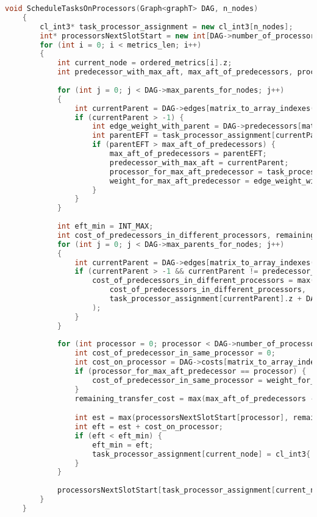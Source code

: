 \newpage
\begin{lstlisting}[language=C++, caption={Algoritmo di selezione del processore},captionpos=b]
	void ScheduleTasksOnProcessors(Graph<graphT> DAG, n_nodes)
	{
		cl_int3* task_processor_assignment = new cl_int3[n_nodes];
		int* processorsNextSlotStart = new int[DAG->number_of_processors];
		for (int i = 0; i < metrics_len; i++)
		{
			int current_node = ordered_metrics[i].z; 
			int predecessor_with_max_aft, max_aft_of_predecessors, processor_for_max_aft_predecessor, weight_for_max_aft_predecessor;
			
			for (int j = 0; j < DAG->max_parents_for_nodes; j++)
			{
				int currentParent = DAG->edges[matrix_to_array_indexes(j, current_node, DAG->len)];
				if (currentParent > -1) {
					int edge_weight_with_parent = DAG->predecessors[matrix_to_array_indexes(j, current_node, DAG->len)];
					int parentEFT = task_processor_assignment[currentParent].z + edge_weight_with_parent;
					if (parentEFT > max_aft_of_predecessors) {
						max_aft_of_predecessors = parentEFT;
						predecessor_with_max_aft = currentParent;
						processor_for_max_aft_predecessor = task_processor_assignment[currentParent].x;
						weight_for_max_aft_predecessor = edge_weight_with_parent;
					}
				}
			}
			
			int eft_min = INT_MAX;
			int cost_of_predecessors_in_different_processors, remaining_transfer_cost;
			for (int j = 0; j < DAG->max_parents_for_nodes; j++)
			{
				int currentParent = DAG->edges[matrix_to_array_indexes(j, current_node, DAG->len)];
				if (currentParent > -1 && currentParent != predecessor_with_max_aft) {
					cost_of_predecessors_in_different_processors = max(
						cost_of_predecessors_in_different_processors,
						task_processor_assignment[currentParent].z + DAG->predecessors[matrix_to_array_indexes(j, current_node, DAG->len)]
					);
				}
			}
			
			for (int processor = 0; processor < DAG->number_of_processors; processor++) {
				int cost_of_predecessor_in_same_processor = 0;
				int cost_on_processor = DAG->costs[matrix_to_array_indexes(current_node, processor, DAG->number_of_processors)];
				if (processor_for_max_aft_predecessor == processor) {
					cost_of_predecessor_in_same_processor = weight_for_max_aft_predecessor;
				}
				remaining_transfer_cost = max(max_aft_of_predecessors - cost_of_predecessor_in_same_processor, cost_of_predecessors_in_different_processors);

				int est = max(processorsNextSlotStart[processor], remaining_transfer_cost);
				int eft = est + cost_on_processor;
				if (eft < eft_min) {
					eft_min = eft;
					task_processor_assignment[current_node] = cl_int3{ processor, est, eft };
				}
			}
			
			processorsNextSlotStart[task_processor_assignment[current_node].x] = task_processor_assignment[current_node].z;
		}
	}
\end{lstlisting}
